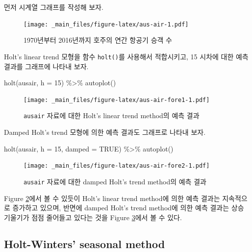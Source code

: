 \documentclass[
]{book}
\newenvironment{Shaded}{\begin{snugshade}}{\end{snugshade}}
\newcommand{\AttributeTok}[1]{\textcolor[rgb]{0.77,0.63,0.00}{#1}}
\newcommand{\ConstantTok}[1]{\textcolor[rgb]{0.00,0.00,0.00}{#1}}
\newcommand{\DecValTok}[1]{\textcolor[rgb]{0.00,0.00,0.81}{#1}}
\newcommand{\FunctionTok}[1]{\textcolor[rgb]{0.00,0.00,0.00}{#1}}
\newcommand{\NormalTok}[1]{#1}
\newcommand{\SpecialCharTok}[1]{\textcolor[rgb]{0.00,0.00,0.00}{#1}}
\begin{document}
먼저 시계열 그래프를 작성해 보자.

\begin{figure}
\centering
\texttt{[image: \_main\_files/figure-latex/aus-air-1.pdf]}
\caption{\label{fig:aus-air}1970년부터 2016년까지 호주의 연간 항공기 승객 수}
\end{figure}

Holt's linear trend 모형을 함수 \texttt{holt()}를 사용해서 적합시키고, 15 시차에 대한 예측 결과를 그래프에 나타내 보자.

\begin{Shaded}
\begin{Highlighting}[]
\FunctionTok{holt}\NormalTok{(ausair, }\AttributeTok{h =} \DecValTok{15}\NormalTok{) }\SpecialCharTok{\%\textgreater{}\%} 
  \FunctionTok{autoplot}\NormalTok{()}
\end{Highlighting}
\end{Shaded}

\begin{figure}
\centering
\texttt{[image: \_main\_files/figure-latex/aus-air-fore1-1.pdf]}
\caption{\label{fig:aus-air-fore1}\texttt{ausair} 자료에 대한 Holt's linear trend method의 예측 결과}
\end{figure}

Damped Holt's trend 모형에 의한 예측 결과도 그래프로 나타내 보자.

\begin{Shaded}
\begin{Highlighting}[]
\FunctionTok{holt}\NormalTok{(ausair, }\AttributeTok{h =} \DecValTok{15}\NormalTok{, }\AttributeTok{damped =} \ConstantTok{TRUE}\NormalTok{) }\SpecialCharTok{\%\textgreater{}\%} 
  \FunctionTok{autoplot}\NormalTok{()}
\end{Highlighting}
\end{Shaded}

\begin{figure}
\centering
\texttt{[image: \_main\_files/figure-latex/aus-air-fore2-1.pdf]}
\caption{\label{fig:aus-air-fore2}\texttt{ausair} 자료에 대한 damped Holt's trend method의 예측 결과}
\end{figure}

Figure \ref{fig:aus-air-fore1}에서 볼 수 있듯이 Holt's linear trend method에 의한 예측 결과는 지속적으로 증가하고 있으며, 반면에 damped Holt's trend method에 의한 예측 결과는 상승 기울기가 점점 줄어들고 있다는 것을 Figure \ref{fig:aus-air-fore2}에서 볼 수 있다.

\hypertarget{holt-winters-seasonal-method}{%
\subsection{Holt-Winters' seasonal method}\label{holt-winters-seasonal-method}}
\end{document}
